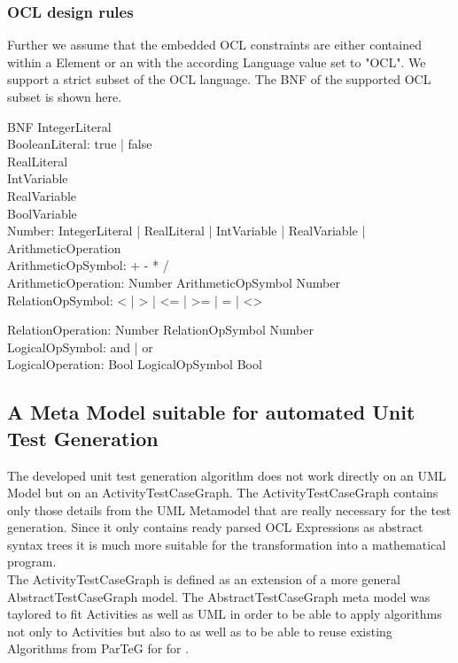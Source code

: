 \subsubsection{OCL design rules}
Further we assume that the embedded OCL constraints are either contained within a  Element or an  with the according Language value set to "OCL". We support a strict subset of the OCL language. The BNF of the supported OCL subset is shown here.

BNF
IntegerLiteral\\
BooleanLiteral: true | false\\
RealLiteral\\
IntVariable\\
RealVariable\\
BoolVariable\\
Number: IntegerLiteral | RealLiteral | IntVariable | RealVariable | ArithmeticOperation\\
ArithmeticOpSymbol: + - * /\\
ArithmeticOperation: Number ArithmeticOpSymbol Number \\
RelationOpSymbol: < | > | <= | >= | = | <> 

RelationOperation: Number RelationOpSymbol Number \\
LogicalOpSymbol: and | or \\
LogicalOperation: Bool LogicalOpSymbol Bool \\

\subsection{A Meta Model suitable for automated Unit Test Generation}
\label{sec:TestCaseGraph}
The developed unit test generation algorithm does not work directly on an UML Model but on an ActivityTestCaseGraph. The ActivityTestCaseGraph contains only those details from the UML Metamodel that are really necessary for the test generation. Since it only contains ready parsed OCL Expressions as abstract syntax trees it is much more suitable for the transformation into a mathematical program. \\
The ActivityTestCaseGraph is defined as an extension of a more general AbstractTestCaseGraph model. The AbstractTestCaseGraph meta model was taylored to fit Activities as well as UML  in order to be able to apply algorithms not only to Activities but also to  as well as to be able to reuse existing Algorithms from ParTeG for  for .

